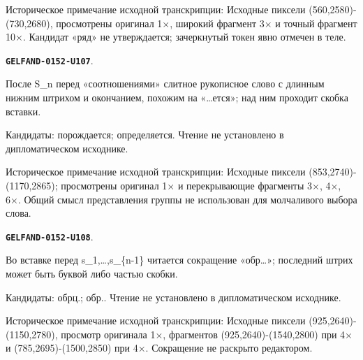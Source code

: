 \documentclass[11pt]{article}
\theoremstyle{definition}
\theoremstyle{remark}
\begin{document}
Историческое примечание исходной транскрипции: Исходные пиксели (560,2580)-(730,2680), просмотрены оригинал 1×, широкий фрагмент 3× и точный фрагмент 10×. Кандидат «ряд» не утверждается; зачеркнутый токен явно отмечен в теле.\par\medskip
\par\noindent\leavevmode{}\label{GELFAND-0152-U107}\label{GELFAND-P001395:symmetric-group-predicate:note}\textbf{\texttt{GELFAND-0152-U107}}.\nopagebreak[4]\par
После S\_n перед «соотношениями» слитное рукописное слово с длинным нижним штрихом и окончанием, похожим на «…ется»; над ним проходит скобка вставки.\par
Кандидаты: порождается; определяется. Чтение не установлено в дипломатическом исходнике.\par
Историческое примечание исходной транскрипции: Исходные пиксели (853,2740)-(1170,2865); просмотрены оригинал 1× и перекрывающие фрагменты 3×, 4×, 6×. Общий смысл представления группы не использован для молчаливого выбора слова.\par\medskip
\par\noindent\leavevmode{}\label{GELFAND-0152-U108}\label{GELFAND-P001395:group-generator-abbreviation:note}\textbf{\texttt{GELFAND-0152-U108}}.\nopagebreak[4]\par
Во вставке перед s\_1,…,s\_\{n-1\} читается сокращение «обр…»; последний штрих может быть буквой либо частью скобки.\par
Кандидаты: обрц.; обр.. Чтение не установлено в дипломатическом исходнике.\par
Историческое примечание исходной транскрипции: Исходные пиксели (925,2640)-(1150,2780), просмотр оригинала 1×, фрагментов (925,2640)-(1540,2800) при 4× и (785,2695)-(1500,2850) при 4×. Сокращение не раскрыто редактором.\par\medskip
\end{document}
